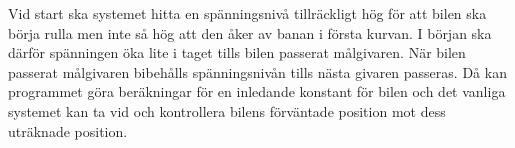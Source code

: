 Vid start ska systemet hitta en spänningsnivå tillräckligt hög för att bilen ska
börja rulla men inte så hög att den åker av banan i första kurvan. I början ska
därför spänningen öka lite i taget tills bilen passerat målgivaren. När bilen
passerat målgivaren bibehålls spänningsnivån tills nästa givaren passeras.
Då kan programmet göra beräkningar för en inledande konstant för bilen och
det vanliga systemet kan ta vid och kontrollera bilens förväntade position mot
dess uträknade position.


